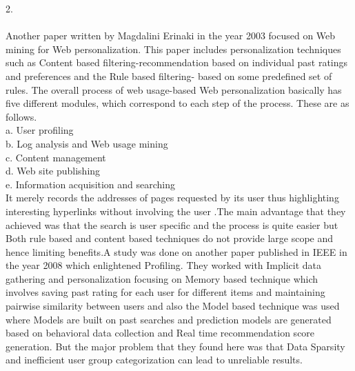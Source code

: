 2.\\ \\ Another paper written by Magdalini Erinaki in the year 2003
focused on Web mining for Web personalization. This
paper includes personalization techniques such as Content
based filtering-recommendation based on individual past
ratings and preferences and the Rule based filtering- based on
some predefined set of rules. The overall process of
web usage-based Web personalization basically has five different modules,
which correspond to each step of the process. These are as
follows.\\
a. User profiling\\
b. Log analysis and Web usage mining\\
c. Content management\\
d. Web site publishing\\
e. Information acquisition and searching\\
It merely records the addresses of pages requested by its user
thus highlighting interesting hyperlinks without involving the
user .The main advantage that they achieved was that the
search is user specific and the process is quite easier but Both
rule based and content based techniques do not provide large
scope and hence limiting benefits.A study was done on another paper published in IEEE in the
year 2008 which enlightened Profiling. They worked with
Implicit data gathering and personalization focusing on
Memory based technique which involves saving past rating for
each user for different items and maintaining pairwise
similarity between users and also the Model based technique
was used where Models are built on past searches and
prediction models are generated based on behavioral data
collection and Real time recommendation score generation.
But the major problem that they found here was that Data
Sparsity and inefficient user group categorization can lead to
unreliable results.\\ 

